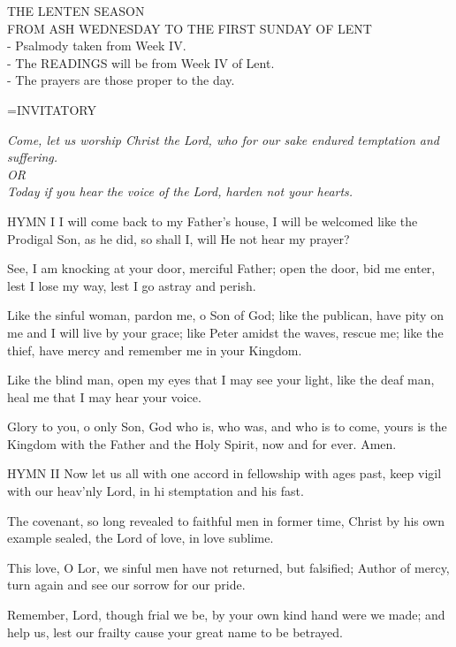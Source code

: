 \begin{center}\normalsize THE LENTEN SEASON\\
\footnotesize FROM ASH WEDNESDAY TO THE FIRST SUNDAY OF LENT\\
\footnotesize - Psalmody taken from Week IV.\\
\footnotesize - The READINGS will be from Week IV of Lent.\\
\footnotesize - The prayers are those proper to the day.\\
\end{center}

\hangindent=\parindent \small{INVITATORY}
\begin{center}
\textit{Come, let us worship Christ the Lord, who for our sake endured temptation and suffering.\\}
\textit{OR\\}
\textit{Today if you hear the voice of the Lord, harden not your hearts.\\}
\end{center}

HYMN I
I will come back to my Father's house,
I will be welcomed like the Prodigal Son,
as he did, so shall I,
will He not hear my prayer?

See, I am knocking at your door, merciful Father;
open the door, bid me enter,
lest I lose my way,
lest I go astray and perish.

Like the sinful woman, pardon me, o Son of God;
like the publican, have pity on me and I will live by your grace;
like Peter amidst the waves, rescue me;
like the thief, have mercy and remember me in your Kingdom.

Like the blind man, open my eyes
that I may see your light,
like the deaf man,  heal me
that I may hear your voice.

Glory to you, o only Son,
God who is, who was, and who is to come,
yours is the Kingdom with the Father and the Holy Spirit,
now and for ever. Amen.

HYMN II
Now let us all with one accord
in fellowship with ages past,
keep vigil with our heav'nly Lord,
in hi stemptation and his fast.

The covenant, so long revealed 
to faithful men in former time,
Christ by his own example sealed,
the Lord of love, in love sublime.

This love, O Lor, we sinful men
have not returned, but falsified;
Author of mercy, turn again
and see our sorrow for our pride.

Remember, Lord, though frial we be,
by your own kind hand were we made;
and help us, lest our frailty
cause your great name to be betrayed.

